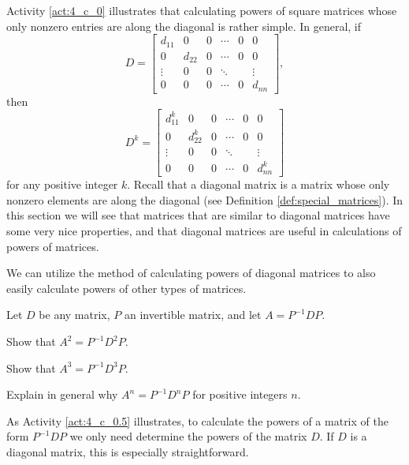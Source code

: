 Activity \ref{act:4_c_0} illustrates that calculating powers of square matrices whose only nonzero entries are along the diagonal is rather simple. In general, if 
\[D = \left[ \begin{array}{cccccc}
d_{11} 	&0 			&0				&\cdots    	&0		&0 \\
0 			& d_{22} 	&0				&\cdots    	&0		&0 \\
 \vdots  & 0      		&0				&\ddots    	&      &\vdots \\
0 			& 0 			&0    			& \cdots		&0  	&d_{nn}
\end{array} \right],\]
then 
\[D^k = \left[ \begin{array}{cccccc}
d_{11}^k 	&0 			&0				&\cdots    	&0		&0 \\
0 			& d_{22}^k 	&0				&\cdots    	&0		&0 \\
 \vdots  & 0      			&0				&\ddots    	&      &\vdots \\
0 			& 0 				&0    			& \cdots		&0  	&d_{nn}^k
\end{array} \right]\]
for any positive integer $k$. Recall that a diagonal matrix is a matrix whose only nonzero elements are along the diagonal (see Definition \ref{def:special_matrices}).  In this section we will see that matrices that are similar to diagonal matrices have some very nice properties, and that diagonal matrices are useful in calculations of powers of matrices. 

We can utilize the method of calculating powers of diagonal matrices to also easily calculate powers of other types of matrices. 

\begin{activity} \label{act:4_c_0.5} Let $D$ be any matrix, $P$ an invertible matrix, and let $A = P^{-1}DP$. 
	\ba
	\item Show that $A^2 = P^{-1}D^2P$.

	\item Show that $A^3 = P^{-1}D^3P$.

	\item Explain in general why $A^n = P^{-1}D^nP$ for positive integers $n$.

	\ea

\end{activity}

As Activity \ref{act:4_c_0.5} illustrates, to calculate the powers of a matrix of the form $P^{-1}DP$ we only need determine the powers of the matrix $D$. If $D$ is a diagonal matrix, this is especially straightforward. 

 
\label{sec:mtx_similar}

